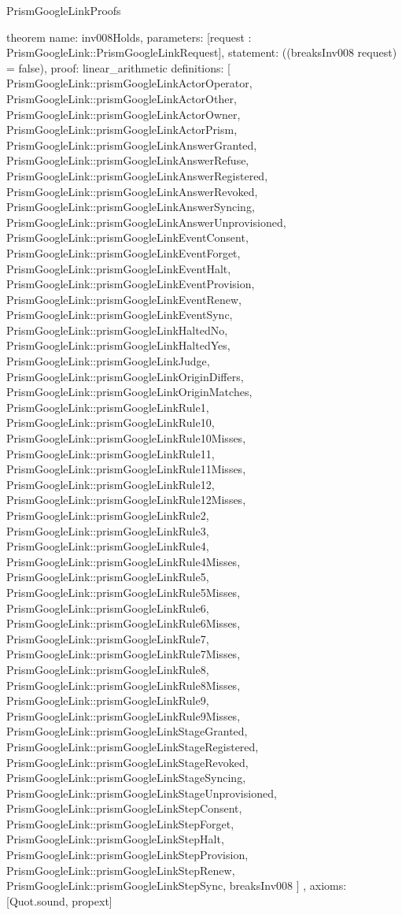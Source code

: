 \begin{lexlean}{PrismGoogleLinkProofs}
\begin{semanticmodule}
theorem{
  name: inv008Holds,
  parameters: [request : PrismGoogleLink::PrismGoogleLinkRequest],
  statement: ((breaksInv008 request) = false),
  proof: linear_arithmetic{
    definitions: [
      PrismGoogleLink::prismGoogleLinkActorOperator,
      PrismGoogleLink::prismGoogleLinkActorOther,
      PrismGoogleLink::prismGoogleLinkActorOwner,
      PrismGoogleLink::prismGoogleLinkActorPrism,
      PrismGoogleLink::prismGoogleLinkAnswerGranted,
      PrismGoogleLink::prismGoogleLinkAnswerRefuse,
      PrismGoogleLink::prismGoogleLinkAnswerRegistered,
      PrismGoogleLink::prismGoogleLinkAnswerRevoked,
      PrismGoogleLink::prismGoogleLinkAnswerSyncing,
      PrismGoogleLink::prismGoogleLinkAnswerUnprovisioned,
      PrismGoogleLink::prismGoogleLinkEventConsent,
      PrismGoogleLink::prismGoogleLinkEventForget,
      PrismGoogleLink::prismGoogleLinkEventHalt,
      PrismGoogleLink::prismGoogleLinkEventProvision,
      PrismGoogleLink::prismGoogleLinkEventRenew,
      PrismGoogleLink::prismGoogleLinkEventSync,
      PrismGoogleLink::prismGoogleLinkHaltedNo,
      PrismGoogleLink::prismGoogleLinkHaltedYes,
      PrismGoogleLink::prismGoogleLinkJudge,
      PrismGoogleLink::prismGoogleLinkOriginDiffers,
      PrismGoogleLink::prismGoogleLinkOriginMatches,
      PrismGoogleLink::prismGoogleLinkRule1,
      PrismGoogleLink::prismGoogleLinkRule10,
      PrismGoogleLink::prismGoogleLinkRule10Misses,
      PrismGoogleLink::prismGoogleLinkRule11,
      PrismGoogleLink::prismGoogleLinkRule11Misses,
      PrismGoogleLink::prismGoogleLinkRule12,
      PrismGoogleLink::prismGoogleLinkRule12Misses,
      PrismGoogleLink::prismGoogleLinkRule2,
      PrismGoogleLink::prismGoogleLinkRule3,
      PrismGoogleLink::prismGoogleLinkRule4,
      PrismGoogleLink::prismGoogleLinkRule4Misses,
      PrismGoogleLink::prismGoogleLinkRule5,
      PrismGoogleLink::prismGoogleLinkRule5Misses,
      PrismGoogleLink::prismGoogleLinkRule6,
      PrismGoogleLink::prismGoogleLinkRule6Misses,
      PrismGoogleLink::prismGoogleLinkRule7,
      PrismGoogleLink::prismGoogleLinkRule7Misses,
      PrismGoogleLink::prismGoogleLinkRule8,
      PrismGoogleLink::prismGoogleLinkRule8Misses,
      PrismGoogleLink::prismGoogleLinkRule9,
      PrismGoogleLink::prismGoogleLinkRule9Misses,
      PrismGoogleLink::prismGoogleLinkStageGranted,
      PrismGoogleLink::prismGoogleLinkStageRegistered,
      PrismGoogleLink::prismGoogleLinkStageRevoked,
      PrismGoogleLink::prismGoogleLinkStageSyncing,
      PrismGoogleLink::prismGoogleLinkStageUnprovisioned,
      PrismGoogleLink::prismGoogleLinkStepConsent,
      PrismGoogleLink::prismGoogleLinkStepForget,
      PrismGoogleLink::prismGoogleLinkStepHalt,
      PrismGoogleLink::prismGoogleLinkStepProvision,
      PrismGoogleLink::prismGoogleLinkStepRenew,
      PrismGoogleLink::prismGoogleLinkStepSync,
      breaksInv008
    ]
  },
  axioms: [Quot.sound, propext]
}


\end{semanticmodule}
\end{lexlean}
